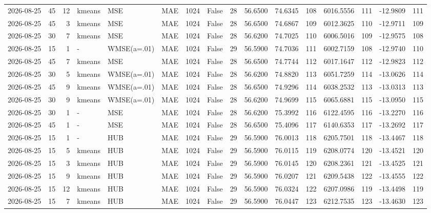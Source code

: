 \documentclass[10pt]{article}
\begin{document}
\begin{landscape}
\begin{longtable}{@{}lrrlllrcrrrrrrrr@{}}
2026-08-25 & 45 & 12 & kmeans & MSE & MAE & 1024 & False & 28 & 56.6500 & 74.6345 & 108 & 6016.5556 & 111 & -12.9809 & 111 \\
2026-08-25 & 45 & 3 & kmeans & MSE & MAE & 1024 & False & 28 & 56.6500 & 74.6867 & 109 & 6012.3625 & 110 & -12.9711 & 109 \\
2026-08-25 & 30 & 7 & kmeans & MSE & MAE & 1024 & False & 28 & 56.6200 & 74.7025 & 110 & 6006.5016 & 109 & -12.9575 & 108 \\
2026-08-25 & 15 & 1 & - & WMSE(a=.01) & MAE & 1024 & False & 29 & 56.5900 & 74.7036 & 111 & 6002.7159 & 108 & -12.9740 & 110 \\
2026-08-25 & 45 & 7 & kmeans & MSE & MAE & 1024 & False & 28 & 56.6500 & 74.7744 & 112 & 6017.1647 & 112 & -12.9823 & 112 \\
2026-08-25 & 30 & 5 & kmeans & WMSE(a=.01) & MAE & 1024 & False & 28 & 56.6200 & 74.8820 & 113 & 6051.7259 & 114 & -13.0626 & 114 \\
2026-08-25 & 45 & 9 & kmeans & WMSE(a=.01) & MAE & 1024 & False & 28 & 56.6500 & 74.9296 & 114 & 6038.2532 & 113 & -13.0313 & 113 \\
2026-08-25 & 30 & 9 & kmeans & WMSE(a=.01) & MAE & 1024 & False & 28 & 56.6200 & 74.9699 & 115 & 6065.6881 & 115 & -13.0950 & 115 \\
2026-08-25 & 30 & 1 & - & MSE & MAE & 1024 & False & 28 & 56.6200 & 75.3992 & 116 & 6122.4595 & 116 & -13.2270 & 116 \\
2026-08-25 & 45 & 1 & - & MSE & MAE & 1024 & False & 28 & 56.6500 & 75.4096 & 117 & 6140.6353 & 117 & -13.2692 & 117 \\
2026-08-25 & 15 & 1 & - & HUB & MAE & 1024 & False & 29 & 56.5900 & 76.0013 & 118 & 6205.7501 & 118 & -13.4467 & 118 \\
2026-08-25 & 15 & 5 & kmeans & HUB & MAE & 1024 & False & 29 & 56.5900 & 76.0115 & 119 & 6208.0774 & 120 & -13.4521 & 120 \\
2026-08-25 & 15 & 3 & kmeans & HUB & MAE & 1024 & False & 29 & 56.5900 & 76.0145 & 120 & 6208.2361 & 121 & -13.4525 & 121 \\
2026-08-25 & 15 & 9 & kmeans & HUB & MAE & 1024 & False & 29 & 56.5900 & 76.0207 & 121 & 6209.5438 & 122 & -13.4555 & 122 \\
2026-08-25 & 15 & 12 & kmeans & HUB & MAE & 1024 & False & 29 & 56.5900 & 76.0324 & 122 & 6207.0986 & 119 & -13.4498 & 119 \\
2026-08-25 & 15 & 7 & kmeans & HUB & MAE & 1024 & False & 29 & 56.5900 & 76.0447 & 123 & 6212.7535 & 123 & -13.4630 & 123 \\

\end{longtable}
\end{landscape}
\end{document}
